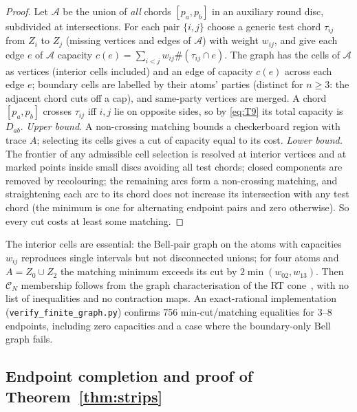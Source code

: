 \documentclass[aps,prd,onecolumn,superscriptaddress,nofootinbib,amsmath,amssymb,11pt]{revtex4-2}
\theoremstyle{definition}
\newcommand{\CN}{\mathcal{C}_N}
\begin{document}
\begin{proof}
Let $\mathcal A$ be the union of \emph{all} chords $[p_a,p_b]$ in an auxiliary round disc, subdivided at intersections. For each pair
$\{i,j\}$ choose a generic test chord $\tau_{ij}$ from $Z_i$ to $Z_j$ (missing vertices and edges of $\mathcal A$) with weight $w_{ij}$, and give
each edge $e$ of $\mathcal A$ capacity $c(e)=\sum_{i<j}w_{ij}\#(\tau_{ij}\cap e)$. The graph has the cells of $\mathcal A$ as vertices (interior cells
included) and an edge of capacity $c(e)$ across each edge $e$; boundary cells are labelled by their atoms' parties (distinct for
$n\ge3$: the adjacent chord cuts off a cap), and same-party vertices are merged. A chord $[p_a,p_b]$ crosses $\tau_{ij}$ iff $i,j$ lie on
opposite sides, so by \eqref{eq:T9} its total capacity is $D_{ab}$.
\emph{Upper bound.} A non-crossing matching bounds a checkerboard region with trace $A$; selecting its cells gives a cut of capacity
equal to its cost. \emph{Lower bound.} The frontier of any admissible cell selection is resolved at interior vertices and at marked points
inside small discs avoiding all test chords; closed components are removed by recolouring; the remaining arcs form a non-crossing
matching, and straightening each arc to its chord does not increase its intersection with any test chord (the minimum is one for
alternating endpoint pairs and zero otherwise). So every cut costs at least some matching.
\end{proof}

The interior cells are essential: the Bell-pair graph on the atoms with capacities $w_{ij}$ reproduces single intervals but not
disconnected unions; for four atoms and $A=Z_0\cup Z_2$ the matching minimum exceeds its cut by $2\min(w_{02},w_{13})$. Then $\CN$ membership
follows from the graph characterisation of the RT cone~\cite{Bao2015}, with no list of inequalities and no contraction maps. An
exact-rational implementation (\texttt{verify\_finite\_graph.py}) confirms 756 min-cut/matching equalities for 3--8 endpoints,
including zero capacities and a case where the boundary-only Bell graph fails.

\subsection{Endpoint completion and proof of Theorem~\ref{thm:strips}}\label{sec:stripUVcompl}
\end{document}
